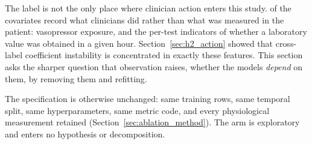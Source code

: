 The label is not the only place where clinician action enters this study.
\pcAblNDropped{} of the \pcHTwoNTerms{} covariates record what clinicians did
rather than what was measured in the patient: vasopressor exposure, and the
per-test indicators of whether a laboratory value was obtained in a given hour.
Section~\ref{sec:h2_action} showed that cross-label coefficient instability is
concentrated in exactly these features. This section asks the sharper question
that observation raises, whether the models \emph{depend} on them, by
removing them and refitting.

The specification is otherwise unchanged: same training rows, same temporal
split, same hyperparameters, same metric code, and every physiological
measurement retained (Section~\ref{sec:ablation_method}). The arm is
exploratory and enters no hypothesis or decomposition.

\begin{table}[H]
    \centering\small
    \caption{Discrimination and best-threshold Utility Score with and without
    the \pcAblNDropped{} action-derived features. Both arms are fitted on the
    same training rows and scored on the same test rows, so the $\Delta$ column
    is a paired difference; Table~\ref{tab:ablation_ci} carries its interval.
    \textbf{[E] exploratory.}}
    \label{tab:ablation}
\end{table}

